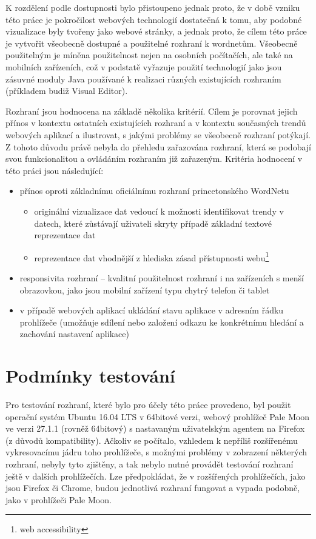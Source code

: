 \documentclass[a4paper, 11pt, oneside]{book}
\newcommand\ex{\textsf}
\begin{document}
				K rozdělení podle dostupnosti bylo přistoupeno jednak proto, že v době vzniku této práce je pokročilost webových technologií dostatečná k tomu, aby podobné vizualizace byly tvořeny jako webové stránky, a jednak proto, že cílem této práce je vytvořit všeobecně dostupné a použitelné rozhraní k wordnetům. Všeobecně použitelným je míněna použitelnost nejen na osobních počítačích, ale také na mobilních zařízeních, což v podstatě vyřazuje použití technologií jako jsou zásuvné moduly Java používané k realizaci různých existujících rozhraním (příkladem budiž \ex{Visual Editor}). 

				Rozhraní jsou hodnocena na základě několika kritérií. Cílem je porovnat jejich přínos v kontextu ostatních existujících rozhraní a v kontextu současných trendů webových aplikací a ilustrovat, s jakými problémy se všeobecně rozhraní potýkají.  Z tohoto důvodu právě nebyla do přehledu zařazována rozhraní, která se podobají svou funkcionalitou a ovládáním rozhraním již zařazeným. Kritéria hodnocení v této práci jsou následující:

					\begin{itemize}
						\item přínos oproti základnímu oficiálnímu rozhraní princetonského WordNetu
							\begin{itemize}
								\item originální vizualizace dat vedoucí k možnosti identifikovat trendy v datech, které zůstávají uživateli skryty případě základní textové reprezentace dat
								\item reprezentace dat vhodnější z hlediska zásad přístupnosti webu\footnote{web accessibility}
							\end{itemize}
						\item responsivita rozhraní -- kvalitní použitelnost rozhraní i na zařízeních s menší obrazovkou, jako jsou mobilní zařízení typu chytrý telefon či tablet
						\item v případě webových aplikací ukládání stavu aplikace v adresním řádku prohlížeče (umožňuje sdílení nebo založení odkazu ke konkrétnímu hledání a zachování nastavení aplikace)
					\end{itemize}

			\section{Podmínky testování}

				Pro testování rozhraní, které bylo pro účely této práce provedeno, byl použit operační systém Ubuntu 16.04 LTS v 64bitové verzi, webový prohlížeč Pale Moon ve verzi 27.1.1 (rovněž 64bitový) s nastavaným uživatelským agentem na Firefox (z důvodů kompatibility). Ačkoliv se počítalo, vzhledem k nepříliš rozšířenému vykresovacímu jádru toho prohlížeče, s možnými problémy v zobrazení některých rozhraní, nebyly tyto zjištěny, a tak nebylo nutné provádět testování rozhraní ještě v dalších prohlížečích. Lze předpokládat, že v rozšířených prohlížečích, jako jsou Firefox či Chrome, budou jednotlivá rozhraní fungovat a vypada podobně, jako v prohlížeči Pale Moon.
\end{document}

